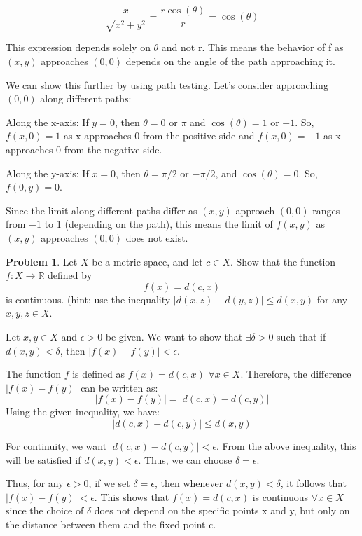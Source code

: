 \documentclass[12]{amsart}
\theoremstyle{definition}
\newtheorem{xca}{Problem}
\newcommand{\R}{\mathbb{R}}
\newcommand{\sskip}{\newpage}
\begin{document}
\[\frac{x}{\sqrt{x^2 + y^2}} = \frac{r \cos(\theta)}{r} = \cos(\theta)\]

This expression depends solely on $\theta$ and not r. This means the behavior of
f as $(x, y)$ approaches $(0, 0)$ depends on the angle of the path approaching it.

We can show this further by using path testing. Let's consider approaching
$(0, 0)$ along different paths:

Along the x-axis: If $y = 0$, then $\theta = 0$ or $\pi$ and $\cos(\theta) = 1$ or $-1$.
So, $f(x, 0) = 1$ as x approaches 0 from the positive side and $f(x, 0) = -1$
as x approaches 0 from the negative side.

Along the y-axis: If $x = 0$, then $\theta = \pi/2$ or $-\pi/2$, and $\cos(\theta) = 0$.
So, $f(0, y) = 0$.

Since the limit along different paths differ as $(x, y)$ approach $(0, 0)$
ranges from $-1$ to 1 (depending on the path), this means the limit of
$f(x, y)$ as $(x, y)$ approaches $(0, 0)$ does not exist.

\sskip


\begin{xca} %
Let $X$ be a metric space, and let $c\in X$. Show that the function $f:X\to\R$ defined by
$$
f(x)=d(c,x)
$$
is continuous. (hint: use the inequality $|d(x,z)-d(y,z)|\leq d(x,y)$ for any $x, y, z\in X$.

\end{xca}

Let $x, y \in X$ and $\epsilon > 0$ be given. We want to show that
$\exists \delta > 0$ such that if $d(x, y) < \delta$, then $|f(x) - f(y)| < \epsilon$.

The function $f$ is defined as $f(x) = d(c, x)$ $\forall x \in X$. Therefore,
the difference $|f(x) - f(y)|$ can be written as:
\[|f(x) - f(y)| = |d(c, x) - d(c, y)|\]
Using the given inequality, we have:
\[|d(c, x) - d(c, y)| \leq d(x, y)\]

For continuity, we want $|d(c, x) - d(c, y)| < \epsilon$. From the above inequality,
this will be satisfied if $d(x, y) < \epsilon$. Thus, we can choose $\delta = \epsilon$.

Thus, for any $\epsilon > 0$, if we set $\delta = \epsilon$, then whenever
$d(x, y) < \delta$, it follows that $|f(x) - f(y)| < \epsilon$.
This shows that $f(x) = d(c, x)$ is continuous $\forall x \in X$ since the choice
of $\delta$ does not depend on the specific points x and y, but only on the distance
between them and the fixed point c.
\end{document}

